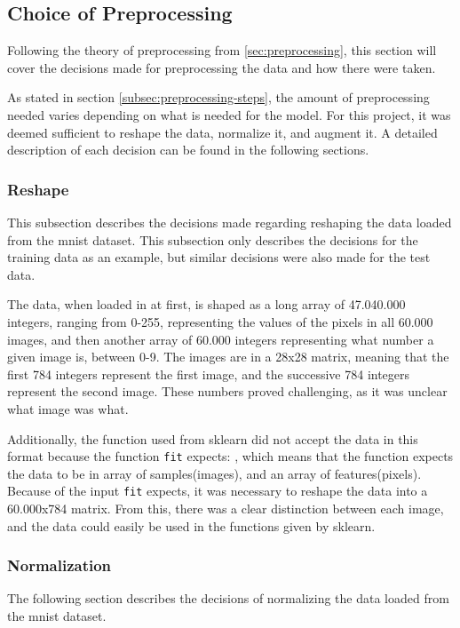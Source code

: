 \subsection{Choice of Preprocessing}
Following the theory of preprocessing from \ref{sec:preprocessing}, this section will cover the decisions made for preprocessing the data and how there were taken.

As stated in section \ref{subsec:preprocessing-steps}, the amount of preprocessing needed varies depending on what is needed for the model. For this project, it was deemed sufficient to reshape the data, normalize it, and augment it. A detailed description of each decision can be found in the following sections.

\subsubsection{Reshape}
This subsection describes the decisions made regarding reshaping the data loaded from the \gls{mnist} dataset. This subsection only describes the decisions for the training data as an example, but similar decisions were also made for the test data.

The data, when loaded in at first, is shaped as a long array of 47.040.000 integers, ranging from 0-255, representing the values of the pixels in all 60.000 images, and then another array of 60.000 integers representing what number a given image is, between 0-9. The images are in a 28x28 matrix, meaning that the first 784 integers represent the first image, and the successive 784 integers represent the second image. These numbers proved challenging, as it was unclear what image was what.

Additionally, the function used from \gls{sklearn} did not accept the data in this format because the function \texttt{fit} expects: , which means that the function expects the data to be in array of samples(images), and an array of features(pixels). Because of the input \texttt{fit} expects, it was necessary to reshape the data into a 60.000x784 matrix. From this, there was a clear distinction between each image, and the data could easily be used in the functions given by \gls{sklearn}.

\subsubsection{Normalization}
The following section describes the decisions of normalizing the data loaded from the \gls{mnist} dataset.


